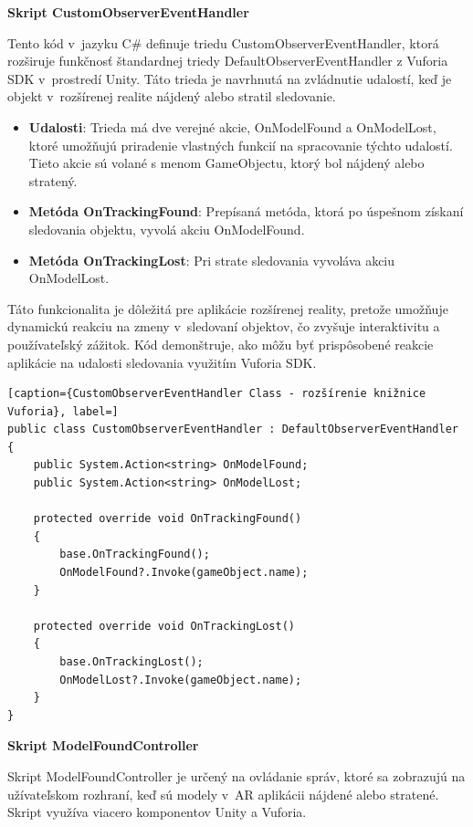 {\large\textbf{Skript CustomObserverEventHandler}}

Tento kód v~jazyku C\# definuje triedu CustomObserverEventHandler, ktorá rozširuje funkčnosť štandardnej triedy DefaultObserverEventHandler z Vuforia SDK v~prostredí Unity. Táto trieda je navrhnutá na zvládnutie udalostí, keď je objekt v~rozšírenej realite nájdený alebo stratil sledovanie.

\begin{itemize}
    \item {\small\textbf{Udalosti}}: Trieda má dve verejné akcie, OnModelFound a OnModelLost, ktoré umožňujú priradenie vlastných funkcií na spracovanie týchto udalostí. Tieto akcie sú volané s menom GameObjectu, ktorý bol nájdený alebo stratený.
    \item {\small\textbf{Metóda OnTrackingFound}}: Prepísaná metóda, ktorá po úspešnom získaní sledovania objektu, vyvolá akciu OnModelFound.
    \item {\small\textbf{Metóda OnTrackingLost}}: Pri strate sledovania vyvoláva akciu OnModelLost.
\end{itemize}

Táto funkcionalita je dôležitá pre aplikácie rozšírenej reality, pretože umožňuje dynamickú reakciu na zmeny v~sledovaní objektov, čo zvyšuje interaktivitu a používateľský zážitok. Kód demonštruje, ako môžu byť prispôsobené reakcie aplikácie na udalosti sledovania využitím Vuforia SDK.

\lstset{style=Csharp}
\begin{lstlisting}[caption={CustomObserverEventHandler Class - rozšírenie knižnice Vuforia}, label=]
public class CustomObserverEventHandler : DefaultObserverEventHandler
{
    public System.Action<string> OnModelFound;
    public System.Action<string> OnModelLost;

    protected override void OnTrackingFound()
    {
        base.OnTrackingFound();
        OnModelFound?.Invoke(gameObject.name);
    }

    protected override void OnTrackingLost()
    {
        base.OnTrackingLost();
        OnModelLost?.Invoke(gameObject.name);
    }
}
\end{lstlisting}

{\large\textbf{Skript ModelFoundController}}

Skript ModelFoundController je určený na ovládanie správ, ktoré sa zobrazujú na užívateľskom rozhraní, keď sú modely v~AR aplikácii nájdené alebo stratené. Skript využíva viacero komponentov Unity a Vuforia.

